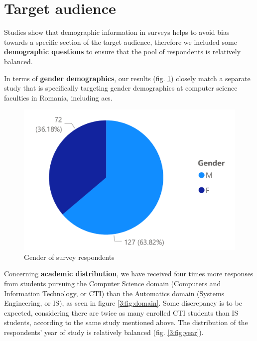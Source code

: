 \section{Target audience} \label{3:target_audience}

Studies\cite{hammer2011importance}\cite{connelly2013demographic} show that demographic information in surveys helps to avoid bias towards a specific section of the target audience, therefore we included some \textbf{demographic questions} to ensure that the pool of respondents is relatively balanced.

In terms of \textbf{gender demographics}, our results (fig. \ref{3:fig:gender}) closely match a separate study\cite{codette2019stats} that is specifically targeting gender demographics at computer science faculties in Romania, including \acrshort{acs}.

\begin{figure}[ht]
    \centering
         \includegraphics[height=0.2\textheight]{figures/charts/survey/gender.pdf}
    \caption{Gender of survey respondents}
    \label{3:fig:gender}
\end{figure}

Concerning \textbf{academic distribution}, we have received  four times more responses from students pursuing the Computer Science domain (Computers and Information Technology, or CTI) than the Automatics domain (Systems Engineering, or IS), as seen in figure \ref{3:fig:domain}. Some discrepancy is to be expected, considering there are twice as many enrolled CTI students than IS students, according to the same study\cite{codette2019stats} mentioned above. The distribution of the respondents' year of study is relatively balanced (fig. \ref{3:fig:year}).

